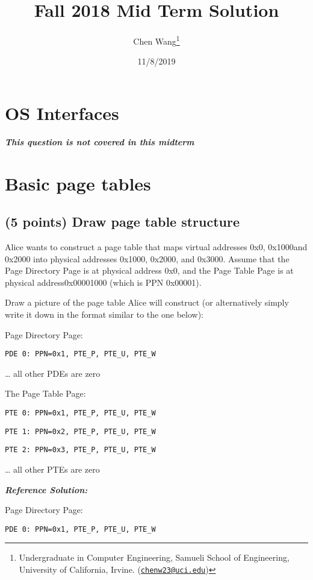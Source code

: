 \documentclass[]{article}
\title{Fall 2018 Mid Term Solution}
\author{Chen Wang\footnote{Undergraduate in Computer Engineering, Samueli School
  of Engineering, University of California, Irvine.
  (\href{mailto:chenw23@uci.edu}{\nolinkurl{chenw23@uci.edu}})}}
\date{11/8/2019}
\begin{document}
\maketitle

{
\setcounter{tocdepth}{3}
\tableofcontents
}
\hypertarget{os-interfaces}{%
\section{OS Interfaces}\label{os-interfaces}}

\textbf{\emph{This question is not covered in this midterm}}

\hypertarget{basic-page-tables}{%
\section{Basic page tables}\label{basic-page-tables}}

\hypertarget{points-draw-page-table-structure}{%
\subsection{(5 points) Draw page table
structure}\label{points-draw-page-table-structure}}

Alice wants to construct a page table that maps virtual addresses 0x0,
0x1000and 0x2000 into physical addresses 0x1000, 0x2000, and 0x3000.
Assume that the Page Directory Page is at physical address 0x0, and the
Page Table Page is at physical address0x00001000 (which is PPN 0x00001).

Draw a picture of the page table Alice will construct (or alternatively
simply write it down in the format similar to the one below):

Page Directory Page:

\texttt{PDE\ 0:\ PPN=0x1,\ PTE\_P,\ PTE\_U,\ PTE\_W}

\ldots{} all other PDEs are zero

The Page Table Page:

\texttt{PTE\ 0:\ PPN=0x1,\ PTE\_P,\ PTE\_U,\ PTE\_W}

\texttt{PTE\ 1:\ PPN=0x2,\ PTE\_P,\ PTE\_U,\ PTE\_W}

\texttt{PTE\ 2:\ PPN=0x3,\ PTE\_P,\ PTE\_U,\ PTE\_W}

\ldots{} all other PTEs are zero

\textbf{\emph{Reference Solution:}}

Page Directory Page:

\texttt{PDE\ 0:\ PPN=0x1,\ PTE\_P,\ PTE\_U,\ PTE\_W}
\end{document}
